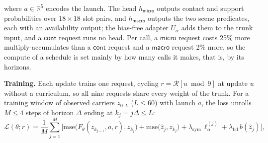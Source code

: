 where $a\in\mathbb{R}^5$ encodes the launch. The head $h_{\textsf{micro}}$ outputs contact and support probabilities over $18\times18$ slot pairs, and $h_{\textsf{macro}}$ outputs the two scene predicates, each with an availability output; the bias-free adapter $U_\alpha$ adds them to the trunk input, and a $\textsf{cont}$ request runs no head. Per call, a $\textsf{micro}$ request costs 25\% more multiply-accumulates than a $\textsf{cont}$ request and a $\textsf{macro}$ request 2\% more, so the compute of a schedule is set mainly by how many calls it makes, that is, by its horizons.

\textbf{Training.} Each update trains one request, cycling $r=\mathcal{R}[u \bmod 9]$ at update $u$ without a curriculum, so all nine requests share every weight of the trunk. For a training window of observed carriers $z_{0:L}$ ($L\le60$) with launch $a$, the loss unrolls $M\le4$ steps of horizon $\Delta$ ending at $k_j=j\Delta\le L$:
\begin{equation}
\mathcal{L}(\theta;r)=\frac1M\sum_{j=1}^{M}\Big[\mathrm{mse}\big(F_\theta(z_{k_{j-1}},a,r),z_{k_j}\big)+\mathrm{mse}\big(\hat z_j,z_{k_j}\big)+\lambda_{\mathrm{sym}}\,\ell_\alpha^{(j)}+\lambda_{\mathrm{bd}}\,b(\hat z_j)\Big],
\label{eq:loss}
\end{equation}
